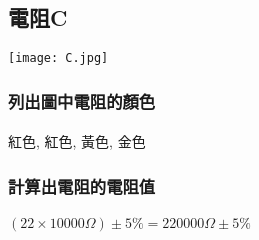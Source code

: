 \subsection{電阻C}
\begin{center} 
\texttt{[image: C.jpg]} 
\end{center} 
\subsubsection{列出圖中電阻的顏色}
\paragraph{}
紅色, 紅色, 黃色, 金色
\subsubsection{計算出電阻的電阻值}
\paragraph{}
$(22 \times 10000\Omega) \pm 5\% = 220000\Omega \pm 5\%$
